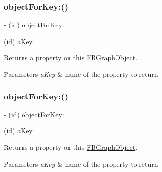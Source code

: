\subsubsection{\texorpdfstring{object\+For\+Key\+:()}{objectForKey:()}\hspace{0.1cm}{\footnotesize\ttfamily [3/5]}}
{\footnotesize\ttfamily -\/ (id) object\+For\+Key\+: \begin{DoxyParamCaption}\item[{(id)}]{a\+Key }\end{DoxyParamCaption}}

Returns a property on this {\ttfamily \hyperlink{interfaceFBGraphObject}{F\+B\+Graph\+Object}}.


\begin{DoxyParams}{Parameters}
{\em a\+Key} & name of the property to return \\
\hline
\end{DoxyParams}
\mbox{\label{protocolFBGraphObject-p_a2ca53cdc300a46e5cdbfe0a2ae705f45}} 
\subsubsection{\texorpdfstring{object\+For\+Key\+:()}{objectForKey:()}\hspace{0.1cm}{\footnotesize\ttfamily [4/5]}}
{\footnotesize\ttfamily -\/ (id) object\+For\+Key\+: \begin{DoxyParamCaption}\item[{(id)}]{a\+Key }\end{DoxyParamCaption}}

Returns a property on this {\ttfamily \hyperlink{interfaceFBGraphObject}{F\+B\+Graph\+Object}}.


\begin{DoxyParams}{Parameters}
{\em a\+Key} & name of the property to return \\
\hline
\end{DoxyParams}
\mbox{\label{protocolFBGraphObject-p_a2ca53cdc300a46e5cdbfe0a2ae705f45}} 
